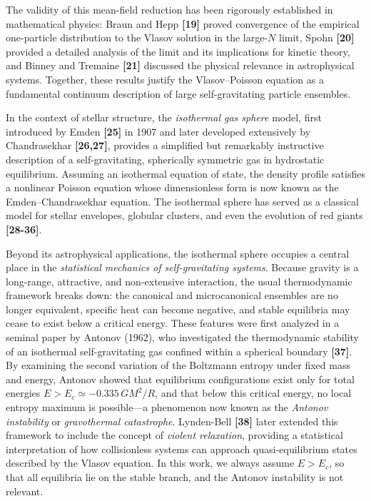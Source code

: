 \documentclass[12pt,a4paper]{article}
\numberwithin{equation}{section}
\begin{document}
The validity of this mean-field reduction has been rigorously established in mathematical physics: Braun and Hepp \textbf{[19]} proved convergence of the empirical one-particle distribution to the Vlasov solution in the large-$N$ limit, Spohn \textbf{[20]} provided a detailed analysis of the limit and its implications for kinetic theory, and Binney and Tremaine \textbf{[21]} discussed the physical relevance in astrophysical systems. Together, these results justify the Vlasov--Poisson equation as a fundamental continuum description of large self-gravitating particle ensembles.

In the context of stellar structure, the \emph{isothermal gas sphere} model, first introduced by Emden \textbf{[25]} in 1907 and later developed extensively by Chandrasekhar \textbf{[26,27]}, provides a simplified but remarkably instructive description of a self-gravitating, spherically symmetric gas in hydrostatic equilibrium. Assuming an isothermal equation of state, the density profile satisfies a nonlinear Poisson equation whose dimensionless form is now known as the Emden--Chandrasekhar equation. The isothermal sphere has served as a classical model for stellar envelopes, globular clusters, and even the evolution of red giants \textbf{[28-36]}.

Beyond its astrophysical applications, the isothermal sphere occupies a central place in the \emph{statistical mechanics of self-gravitating systems}. Because gravity is a long-range, attractive, and non-extensive interaction, the usual thermodynamic framework breaks down: the canonical and microcanonical ensembles are no longer equivalent, specific heat can become negative, and stable equilibria may cease to exist below a critical energy. These features were first analyzed in a seminal paper by Antonov (1962), who investigated the thermodynamic stability of an isothermal self-gravitating gas confined within a spherical boundary \textbf{[37]}. By examining the second variation of the Boltzmann entropy under fixed mass and energy, Antonov showed that equilibrium configurations exist only for total energies $E > E_c \simeq -0.335\, G M^2 / R$, and that below this critical energy, no local entropy maximum is possible---a phenomenon now known as the \emph{Antonov instability} or \emph{gravothermal catastrophe}. Lynden-Bell \textbf{[38]} later extended this framework to include the concept of \emph{violent relaxation}, providing a statistical interpretation of how collisionless systems can approach quasi-equilibrium states described by the Vlasov equation. In this work, we always assume $E>E_c$, so that all equilibria lie on the stable branch, and the Antonov instability is not relevant.
\end{document}
